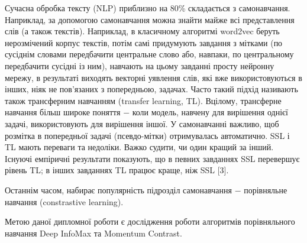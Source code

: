 Сучасна обробка тексту (NLP) приблизно на 80\% складається з самонавчання. Наприклад, за допомогою самонавчання можна знайти майже всі представлення слів (а також текстів). Наприклад, в класичному алгоритмі word2vec беруть нерозмічений корпус текстів, потім самі придумують завдання з мітками (по сусіднім словами передбачити центральне слово або, навпаки, по центральному передбачити сусідні із ним), навчають на цьому завданні просту нейронну мережу, в результаті виходять векторні уявлення слів, які вже використовуються в інших, ніяк не пов'язаних з попередньою, задачах. Часто такий підхід називають також трансферним навчанням (transfer learning, TL). Вцілому, трансферне навчання більш широке поняття $-$ коли модель, навчену для вирішення однієї задачі, використовують для вирішення іншої. У самонавчанні важливо, щоб розмітка в попередньої задачі (псевдо-мітки) отримувалась автоматично. 
SSL і TL мають переваги та недоліки. Важко судити, чи один кращий за інший. Існуючі емпіричні результати показують, що в певних завданнях SSL перевершує рівень TL; в інших завданнях TL працює краще, ніж SSL [3].



Останнім часом, набирає популярність підрозділ самонавчання $-$ порівняльне навчання (constrastive learning).

Метою даної дипломної роботи є дослідження роботи алгоритмів порівняльного навчання Deep InfoMax та Momentum Contrast.

